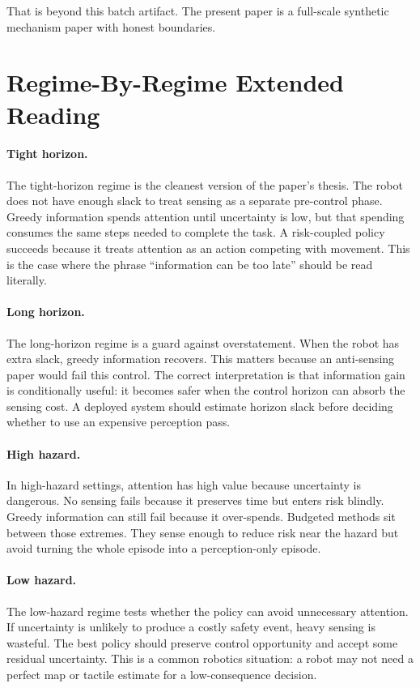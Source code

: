 \documentclass{article}
\begin{document}
That is beyond this batch artifact. The present paper is a full-scale synthetic
mechanism paper with honest boundaries.

\section{Regime-By-Regime Extended Reading}

\paragraph{Tight horizon.}
The tight-horizon regime is the cleanest version of the paper's thesis. The
robot does not have enough slack to treat sensing as a separate pre-control
phase. Greedy information spends attention until uncertainty is low, but that
spending consumes the same steps needed to complete the task. A risk-coupled
policy succeeds because it treats attention as an action competing with
movement. This is the case where the phrase ``information can be too late''
should be read literally.

\paragraph{Long horizon.}
The long-horizon regime is a guard against overstatement. When the robot has
extra slack, greedy information recovers. This matters because an anti-sensing
paper would fail this control. The correct interpretation is that information
gain is conditionally useful: it becomes safer when the control horizon can
absorb the sensing cost. A deployed system should estimate horizon slack before
deciding whether to use an expensive perception pass.

\paragraph{High hazard.}
In high-hazard settings, attention has high value because uncertainty is
dangerous. No sensing fails because it preserves time but enters risk blindly.
Greedy information can still fail because it over-spends. Budgeted methods sit
between those extremes. They sense enough to reduce risk near the hazard but
avoid turning the whole episode into a perception-only episode.

\paragraph{Low hazard.}
The low-hazard regime tests whether the policy can avoid unnecessary
attention. If uncertainty is unlikely to produce a costly safety event, heavy
sensing is wasteful. The best policy should preserve control opportunity and
accept some residual uncertainty. This is a common robotics situation: a robot
may not need a perfect map or tactile estimate for a low-consequence decision.
\end{document}
